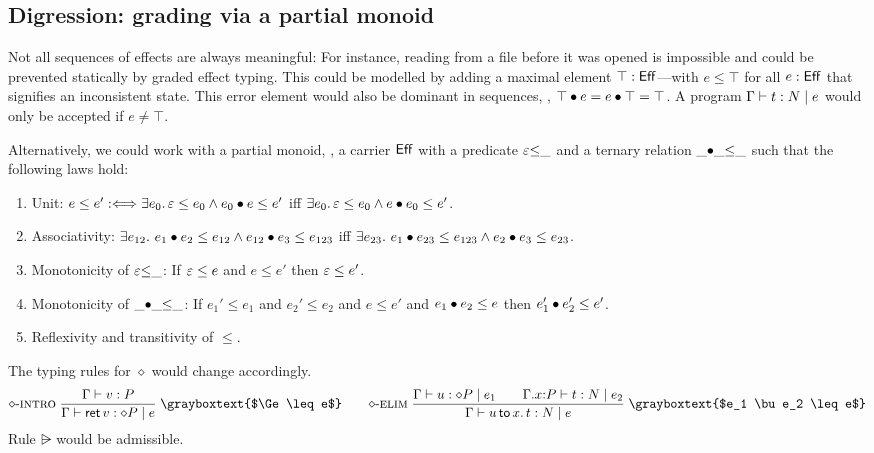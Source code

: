\documentclass[acmsmall,review,anonymous]{acmart}\settopmatter{printfolios=true,printccs=false,printacmref=false}
\newcommand{\graybox}[1]{\grayboxtext{$#1$}}
\theoremstyle{remark}
\begin{document}
\subsection{Digression: grading via a partial monoid}

Not all sequences of effects are always meaningful: For instance,
reading from a file before it was opened is impossible and could be
prevented statically by graded effect typing.  This could be modelled
by adding a maximal element $\top : \Eff$---with $e \leq \top$ for all
$e : \Eff$ that signifies an inconsistent state.  This error element
would also be dominant in sequences, \ie,
$\top \bu e = e \bu \top = \top$.
A program $\CompTy \Gamma t e N$ would only be accepted if $e \not= \top$.

Alternatively, we could work with a partial monoid, \ie, a carrier $\Eff$ with a predicate $\Ge{\leq}\_$ and a ternary relation $\_{\bu}\_{\leq}\_$ such that
the following laws hold:
\begin{enumerate}
\item Unit: $e \leq e' \defiff \exists e_0.\, \Ge \leq e_0 \land e_0 \bu e \leq e'$ iff $\exists e_0.\, \Ge \leq e_0 \land e \bu e_0 \leq e'$.
\item Associativity: $\exists e_{12}.\ e_1 \bu e_2 \leq e_{12} \land e_{12} \bu e_3 \leq e_{123}$ iff $\exists e_{23}.\ e_1 \bu e_{23} \leq e_{123} \land e_2 \bu e_3 \leq e_{23}$.
\item Monotonicity of $\Ge{\leq}\_$: If $\Ge \leq e$ and $e \leq e'$ then $\Ge \leq e'$.
\item Monotonicity of $\_{\bu}\_{\leq}\_$:  If $e_1' \leq e_1$ and $e_2' \leq e_2$ and $e \leq e'$ and $e_1 \bu e_2 \leq e$ then $e_1' \bu e_2' \leq e'$.
\item Reflexivity and transitivity of $\leq$.
\end{enumerate}
The typing rules for $\diamond$ would change accordingly.
\begin{gather*}
 \nrux{\rintro\diamond}
     {\ValTy \Gamma v P
    }{\CompTy \Gamma {\ret v} e {\diamond P}
    }{\graybox{\Ge \leq e}}
\qquad
 \nrux{\relim\diamond}
     {\CompTy \Gamma u {e_1} {\diamond P} \qquad
      \CompTy {\ext \Gamma x P} t {e_2} N
    }{\CompTy \Gamma {\bind x u t} e N
    }{\graybox{e_1 \bu e_2 \leq e}}
\end{gather*}
Rule $\rsub$ would be admissible.
\end{document}

